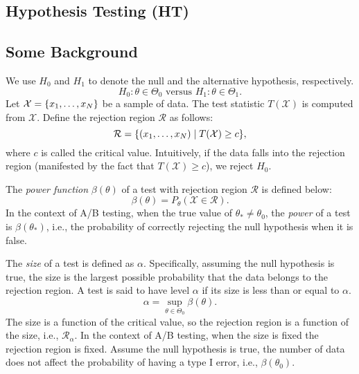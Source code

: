 \subsection{Hypothesis Testing (HT)}
    \subsection{Some Background}
        We use $H_0$ and $H_1$ to denote the null and the alternative hypothesis, respectively.
            \begin{equation}
                H_0: \theta \in  \Theta_0 \text{ versus } H_1: \theta \in \Theta_1. 
            \end{equation}
        Let $\mathcal{X} = \{ x_1, \ldots, x_N \}$  be a sample of data.
        The test statistic $T(\mathcal{X})$ is computed from $\mathcal{X}$.
        Define the rejection region $\mathcal{R}$ as follows:
            \begin{equation}
                \mathcal{R}  = \{ (x_1, \ldots, x_N) \mid T(\mathcal{X}) \ge c \},
            \end{equation}
        where $c$ is called the critical value.
        Intuitively, if the data falls into the rejection region (manifested by the fact that $T(\mathcal{X}) \ge c$), we reject $H_0$.

        The \emph{power function} $\beta(\theta)$ of a test with rejection region $\mathcal{R}$ is defined below:
            \begin{equation}
                \beta(\theta) = P_\theta(\mathcal{X} \in \mathcal{R}).
            \end{equation}
        In the context of A/B testing, when the true value of $\theta_\ast \ne \theta_0$, the \emph{power} of a test is $\beta(\theta_\ast)$, i.e., the probability of correctly rejecting the null hypothesis when it is false.
        
        The \emph{size}  of a test is defined as $\alpha$. 
        Specifically, assuming the null hypothesis is true, the size is the largest possible probability that the data belongs to the rejection region.  
        A test is said to have level $\alpha$ if its size is less than or equal to $\alpha$.
            \begin{equation}
                \alpha  = \sup_{\theta \in \Theta_0} \beta(\theta).
            \end{equation}
        The size is a function of the critical value, so the rejection region is a function of the size, i.e., $\mathcal{R}_\alpha$.
        In the context of A/B testing, when the size is fixed the rejection region is fixed. Assume the null hypothesis is true, the number of data does not affect the probability of having a type I error, i.e., $\beta(\theta_0)$.

